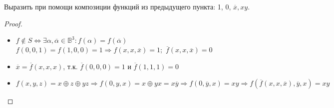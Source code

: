\begin{problem}
Выразить при помощи композиции функций из предыдущего пункта: 1, 0, $\overline{x}, xy$.
\end{problem}
\begin{proof} $ $\\
    \begin{itemize}
        \item $f \notin S \Leftrightarrow \exists \alpha, \overline{\alpha} \in \mathbb{B}^3: f(\alpha) = f(\overline{\alpha})$\\
        $f(0, 0, 1) = f(1, 0, 0) = 1 \Rightarrow f(x, x, \overline{x}) = 1;$ $\overline{f}(x, x, \overline{x}) = 0$
        \item $\overline{x} = \overline{f}(x, x, x)$, т.к. $\overline{f}(0,0,0) = 1$ и $\overline{f}(1, 1, 1) = 0 $
        \item $f(x, y, z) = x \oplus z \oplus yz \Rightarrow f(0, y, x) = x \oplus yx = x\overline{y} \Rightarrow f(0, \overline{y}, x) = xy \Rightarrow f(\overline{f}(x, x, \overline{x}), \overline{y}, x) = xy$
    \end{itemize}
\end{proof}
